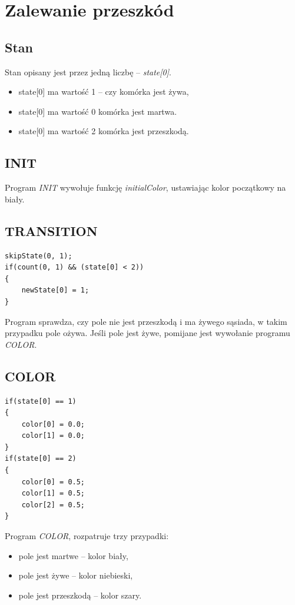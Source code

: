 \documentclass[declaration,shortabstract, inz]{iithesis}
\theoremstyle{definition} \newtheorem{definition}{Definicja}[]
\theoremstyle{plain} \newtheorem{remark}[definition]{Obserwacja}
\theoremstyle{plain} \newtheorem{theorem}[definition]{Twierdzenie}
\theoremstyle{plain} \newtheorem{example}{Przykład}[definition]
\theoremstyle{plain} \newtheorem{lemma}[definition]{Lemat}
\begin{document}
\section{Zalewanie przeszkód}

\subsection{Stan}
Stan opisany jest przez jedną liczbę -- \textit{state[0]}.
\begin{itemize}
\item state[0] ma wartość 1 -- czy komórka jest żywa,
\item state[0] ma wartość 0 komórka jest martwa.
\item state[0] ma wartość 2 komórka jest przeszkodą.
\end{itemize}

\subsection{INIT}

Program \textit{INIT} wywołuje funkcję \textit{initialColor}, ustawiając kolor początkowy na biały.

\subsection{TRANSITION}

\begin{center}
\begin{lstlisting}
skipState(0, 1);
if(count(0, 1) && (state[0] < 2))
{
	newState[0] = 1;
}
\end{lstlisting}
\end{center}

Program sprawdza, czy pole nie jest przeszkodą i ma żywego sąsiada, w takim przypadku pole ożywa. Jeśli pole jest żywe, pomijane jest wywołanie programu \textit{COLOR}.

\subsection{COLOR}

\begin{center}
\begin{lstlisting}
if(state[0] == 1)
{
	color[0] = 0.0;
	color[1] = 0.0;
}
if(state[0] == 2)
{
	color[0] = 0.5;
	color[1] = 0.5;
	color[2] = 0.5;
}
\end{lstlisting}
\end{center}
Program \textit{COLOR}, rozpatruje trzy przypadki: 
\begin{itemize}
\item pole jest martwe -- kolor biały,
\item pole jest żywe -- kolor niebieski,
\item pole jest przeszkodą -- kolor szary.
\end{itemize}
\end{document}
